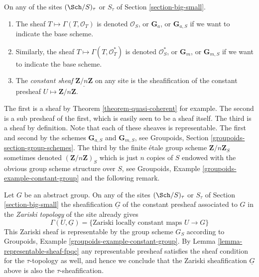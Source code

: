 \begin{definition}
\label{definition-additive-sheaf}
On any of the sites $(\Sch/S)_\tau$ or $S_\tau$ of
Section \ref{section-big-small}.
\begin{enumerate}
\item The sheaf $T \mapsto \Gamma(T, \mathcal{O}_T)$ is denoted
$\mathcal{O}_S$, or $\mathbf{G}_a$, or $\mathbf{G}_{a, S}$ if we
want to indicate the base scheme.
\item Similarly, the sheaf
$T \mapsto \Gamma(T, \mathcal{O}^*_T)$ is denoted $\mathcal{O}_S^*$, or
$\mathbf{G}_m$, or $\mathbf{G}_{m, S}$ if we want
to indicate the base scheme.
\item The {\it constant sheaf} $\underline{\mathbf{Z}/n\mathbf{Z}}$ on any
site is the sheafification of the constant presheaf
$U \mapsto \mathbf{Z}/n\mathbf{Z}$.
\end{enumerate}
\end{definition}

\noindent
The first is a sheaf by
Theorem \ref{theorem-quasi-coherent}
for example. The second is a sub presheaf of the first, which is easily seen
to be a sheaf itself. The third is a sheaf by definition.
Note that each of these sheaves is representable.
The first and second by the schemes $\mathbf{G}_{a, S}$ and
$\mathbf{G}_{m, S}$, see
Groupoids, Section \ref{groupoids-section-group-schemes}.
The third by the finite \'etale group scheme $\mathbf{Z}/n\mathbf{Z}_S$
sometimes denoted $(\mathbf{Z}/n\mathbf{Z})_S$
which is just $n$ copies of $S$ endowed
with the obvious group scheme structure over $S$, see
Groupoids, Example \ref{groupoids-example-constant-group}
and the following remark.

\begin{remark}
\label{remark-constant-locally-constant-maps}
Let $G$ be an abstract group.
On any of the sites $(\Sch/S)_\tau$ or $S_\tau$ of
Section \ref{section-big-small}
the sheafification $\underline{G}$
of the constant presheaf associated to $G$ in the
{\it Zariski topology} of the site already gives
$$
\Gamma(U, \underline{G}) =
\{\text{Zariski locally constant maps }U \to G\}
$$
This Zariski sheaf is representable by the group scheme $G_S$ according to
Groupoids, Example \ref{groupoids-example-constant-group}.
By
Lemma \ref{lemma-representable-sheaf-fpqc}
any representable presheaf satisfies the sheaf condition for the
$\tau$-topology as well, and hence we conclude that the Zariski
sheafification $\underline{G}$ above is also the $\tau$-sheafification.
\end{remark}

